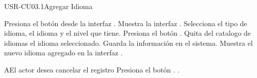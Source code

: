 \begin{UseCase}[]{USR-CU03.1}{Agregar Idioma}{
}
\end{UseCase}

\begin{UCtrayectoria}
	\UCpaso [\UCactor] Presiona el botón \IUAgregar{} desde la interfaz .
    \UCpaso [\UCsist] Muestra la interfaz .
	\UCpaso [\UCactor] Selecciona el tipo de idioma, el idioma y el nivel que tiene.
	\UCpaso [\UCactor] Presiona el botón .
	\UCpaso [\UCsist] Quita del catalogo de idiomas el idioma seleccionado.
	\UCpaso [\UCsist] Guarda la información en el sistema.
	\UCpaso [\UCsist] Muestra el nuevo idioma agregado en la interfaz .
\end{UCtrayectoria}

\begin{UCtrayectoriaA}{A}{El actor desea cancelar el registro}
	\UCpaso [\UCsist] Presiona el botón .
	.
\end{UCtrayectoriaA} 

